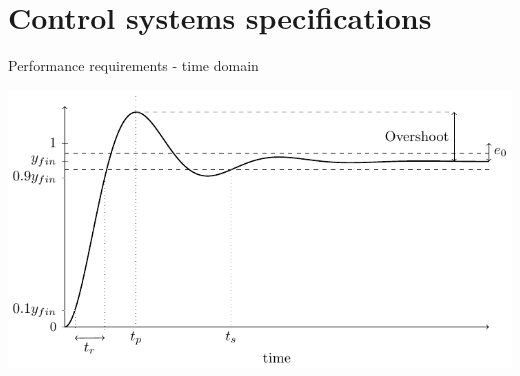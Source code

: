 \documentclass[presentation,aspectratio=169, usenames, dvipsnames]{beamer}
\begin{document}
\section{Control systems specifications}
\label{sec:org1715818}

\begin{frame}[label={sec:orgab5ae99}]{Performance requirements - time domain}
\begin{center}
  \includegraphics[width=.8\linewidth]{../../figures/step-response-specifications}
\end{center}
\end{frame}
\end{document}
